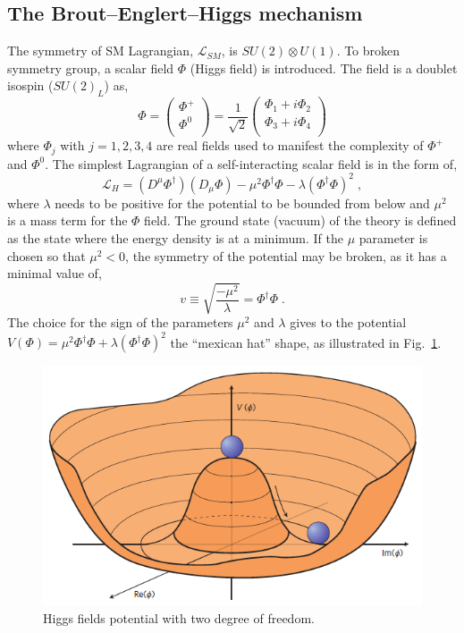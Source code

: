 \subsection*{The Brout–Englert–Higgs mechanism}
The symmetry of SM Lagrangian, $\mathcal{L}_{SM}$, is $SU(2) \otimes U(1)$. To broken symmetry group,  a  scalar field $\Phi$ (Higgs field) is introduced. The field is a doublet isospin ($SU(2)_L$) as,
\newline
$$
\Phi=
\left(
\begin{array}{c}
\Phi^+   \\
\Phi^0 \\
\end{array}
\right)
=\frac{1}{\sqrt{2}}
\left(
\begin{array}{c}
\Phi_1 + i\Phi_2   \\
\Phi_3 + i\Phi_4  \\
\end{array}
\right)
$$
where $\Phi_j$ with $j=1,2,3,4$ are real fields used to manifest the complexity of $\Phi^+$ and  $\Phi^0$. The simplest Lagrangian of a self-interacting scalar field is in the form of,
\begin{equation}
 \mathcal{L}_{H}= (D^{\mu} \Phi^{\dag})(D_{\mu} \Phi) -\mu^2 \Phi^{\dag}\Phi - \lambda(\Phi^{\dag}\Phi)^2 \; , \end{equation}
where $\lambda$ needs to be positive for the potential to be bounded from below and $\mu^2$
 is a mass term for the $\Phi$ field.
The ground state (vacuum) of the theory is defined as the state where the energy density is at a minimum.
If the $\mu$ parameter is chosen so that $\mu^2<0$, the symmetry of the potential may be broken,
as it has a minimal value of,
\newline
\begin{equation}
v\equiv
\sqrt{\frac{-\mu^2}{\lambda}}=\Phi^{\dag}\Phi \; .
\label{min}
\end{equation}
The choice for the sign of the
parameters $\mu^2$ and $\lambda$ gives to the potential $V(\Phi)= \mu^2 \Phi^{\dag}\Phi + \lambda(\Phi^{\dag}\Phi)^2$ the ``mexican hat'' shape, as illustrated in Fig.~\ref{higgspotential}.
\begin{figure}
\centering
\includegraphics[scale= 0.33]{../Cap1/higgspotential}
\caption{Higgs fields potential with two degree of freedom.}
\label{higgspotential}
\end{figure}
